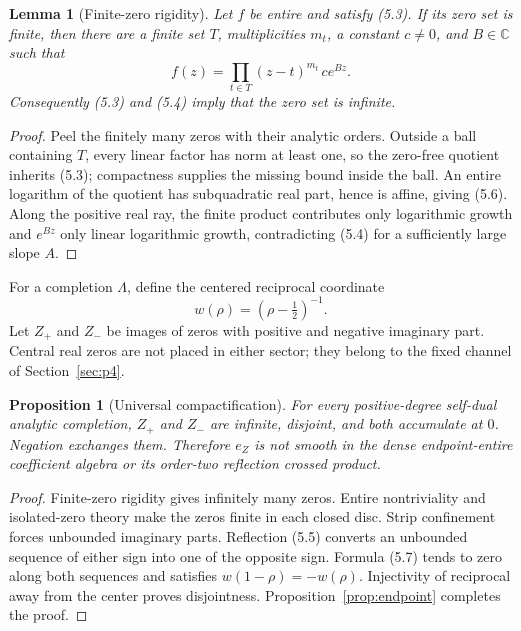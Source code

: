 \documentclass[11pt,reqno]{amsart}
\newtheorem{proposition}[theorem]{Proposition}
\newtheorem{lemma}[theorem]{Lemma}
\newcommand{\C}{\mathbb C}
\begin{document}
\begin{lemma}[Finite-zero rigidity]\label{lem:rigidity}
Let $f$ be entire and satisfy \textup{(5.3)}.  If its zero set is finite, then there are a finite
set $T$, multiplicities $m_t$, a constant $c\ne0$, and $B\in\C$ such that
\[
        f(z)=\prod_{t\in T}(z-t)^{m_t}\,c e^{Bz}.     \tag{5.6}
\]
Consequently (5.3) and (5.4) imply that the zero set is infinite.
\end{lemma}

\begin{proof}
Peel the finitely many zeros with their analytic orders.  Outside a ball containing $T$, every
linear factor has norm at least one, so the zero-free quotient inherits (5.3); compactness supplies
the missing bound inside the ball.  An entire logarithm of the quotient has subquadratic real
part, hence is affine, giving (5.6).  Along the positive real ray, the finite product contributes
only logarithmic growth and $e^{Bz}$ only linear logarithmic growth, contradicting (5.4) for a
sufficiently large slope $A$.
\end{proof}

For a completion $\Lambda$, define the centered reciprocal coordinate
\[
               w(\rho)=(\rho-\tfrac12)^{-1}.         \tag{5.7}
\]
Let $Z_+$ and $Z_-$ be images of zeros with positive and negative imaginary part.  Central real
zeros are not placed in either sector; they belong to the fixed channel of Section~\ref{sec:p4}.

\begin{proposition}[Universal compactification]\label{prop:compactification}
For every positive-degree self-dual analytic completion, $Z_+$ and $Z_-$ are infinite, disjoint,
and both accumulate at $0$.  Negation exchanges them.  Therefore $e_Z$ is not smooth in the dense
endpoint-entire coefficient algebra or its order-two reflection crossed product.
\end{proposition}

\begin{proof}
Finite-zero rigidity gives infinitely many zeros.  Entire nontriviality and isolated-zero
theory make the zeros finite in each closed disc.  Strip confinement forces unbounded imaginary
parts.  Reflection (5.5) converts an unbounded sequence of either sign into one of the opposite
sign.  Formula (5.7) tends to zero along both sequences and satisfies
$w(1-\rho)=-w(\rho)$.  Injectivity of reciprocal away from the center proves disjointness.
Proposition~\ref{prop:endpoint} completes the proof.
\end{proof}
\end{document}
